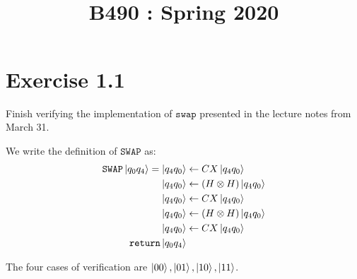 \documentclass[11pt]{article}
\title{
    \vspace{2in}
    \textmd{\textbf{\tit}}\\
    \normalsize\vspace{0.1in}\small{B490 : Spring 2020 }\\
    \vspace{0.1in}\large{\textit{\auths}}
    \vspace{3in}
}
\date{}
\def\swap{\texttt{SWAP}}
\begin{document}
\maketitle
\pagebreak


\section*{Exercise 1.1}
Finish verifying the implementation of $\texttt{swap}$ presented in the lecture notes from March 31. 

We write the definition of $\swap$ as: 
\begin{align*}
    \swap\ket{q_0q_4} = 
    \ket{q_4q_0} &\leftarrow CX\ket{q_4q_0} \\
    \ket{q_4q_0} &\leftarrow (H \otimes H)\ket{q_4q_0} \\
    \ket{q_4q_0} &\leftarrow CX\ket{q_4q_0} \\
    \ket{q_4q_0} &\leftarrow (H \otimes H)\ket{q_4q_0} \\
    \ket{q_4q_0} &\leftarrow CX\ket{q_4q_0}  \\
     \texttt{return} \ket{q_0q_4}
\end{align*}

The four cases of verification are $\ket{00},\ket{01},\ket{10},\ket{11}$. 
\end{document}
